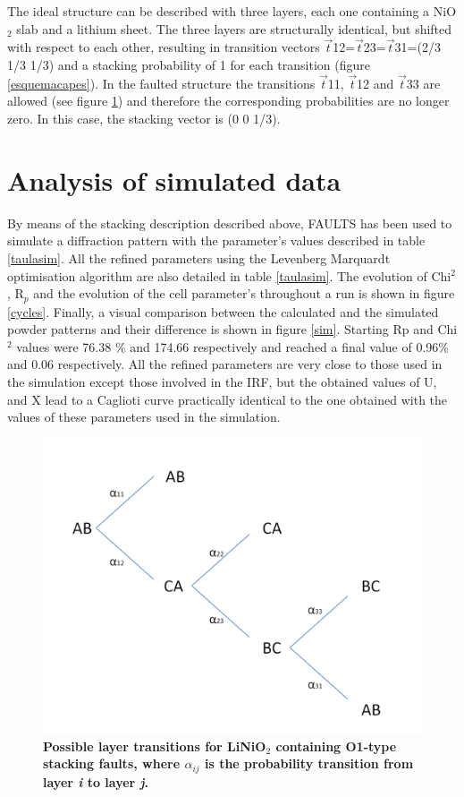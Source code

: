 The ideal structure can be described with three layers, each one containing a NiO$_{2}$ slab and a lithium sheet. The three layers are structurally identical, but shifted with respect to each other, resulting in transition vectors $\vec{t}$12=$\vec{t}$23=$\vec{t}$31=(2/3 1/3 1/3) and a stacking probability of 1 for each transition (figure \ref{esquemacapes}). In the faulted structure the transitions $\vec{t}$11, $\vec{t}$12 and $\vec{t}$33 are allowed (see figure \ref{capes}) and therefore the corresponding probabilities are no longer zero. In this case, the stacking vector is (0 0 1/3).   
 
 
\section{Analysis of simulated data}

By  means of the  stacking description described above, FAULTS has been used to simulate a diffraction pattern with the parameter's values described in table \ref{taulasim}.
All the refined parameters using the Levenberg Marquardt optimisation algorithm are also detailed in table \ref{taulasim}. The evolution of Chi$^{2}$, R$_{p}$ and the evolution of the cell parameter's throughout a run is shown in figure \ref{cycles}. Finally, a visual comparison between the calculated and the simulated powder patterns and their difference is shown in figure \ref{sim}.
Starting Rp and Chi$^{2}$ values were 76.38 $\%$  and 174.66 respectively and reached a final value of 0.96$\%$ and 0.06 respectively. 
All the refined parameters are very close to those used in the simulation except those involved in the IRF, but the obtained values of U, and X lead to a Caglioti curve practically 
identical to the one obtained with the values of these parameters used in the simulation.

\begin{figure}[!htbp]
\begin{center}
\includegraphics [width=4 in]{transitions.png}
\caption{\bf Possible layer transitions for LiNiO$_2$ containing O1-type stacking faults, where $\alpha_{ij}$ is the probability transition from layer \emph{i} to layer \emph{j}.}
\label{capes}
\end{center}
\end{figure}
 

